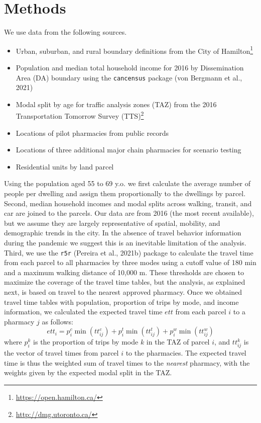 \documentclass[]{elsarticle} %
\providecommand{\tightlist}{%
  \setlength{\itemsep}{0pt}\setlength{\parskip}{0pt}}
\begin{document}
\hypertarget{methods}{%
\section{Methods}\label{methods}}

We use data from the following sources.

\begin{itemize}
\tightlist
\item
  Urban, suburban, and rural boundary definitions from the City of
  Hamilton\footnote{\url{https://open.hamilton.ca/}}
\item
  Population and median total household income for 2016 by Dissemination
  Area (DA) boundary using the \texttt{cancensus} package (von Bergmann
  et al., 2021)
\item
  Modal split by age for traffic analysis zones (TAZ) from the 2016
  Transportation Tomorrow Survey
  (TTS)\footnote{\url{http://dmg.utoronto.ca/}}
\item
  Locations of pilot pharmacies from public records
\item
  Locations of three additional major chain pharmacies for scenario
  testing
\item
  Residential units by land parcel
\end{itemize}

Using the population aged 55 to 69 y.o. we first calculate the average
number of people per dwelling and assign them proportionally to the
dwellings by parcel. Second, median household incomes and modal splits
across walking, transit, and car are joined to the parcels. Our data are
from 2016 (the most recent available), but we assume they are largely
representative of spatial, mobility, and demographic trends in the city.
In the absence of travel behavior information during the pandemic we
suggest this is an inevitable limitation of the analysis. Third, we use
the \texttt{r5r} (Pereira et al., 2021b) package to calculate the travel
time from each parcel to all pharmacies by three modes using a cutoff
value of 180 min and a maximum walking distance of 10,000 m. These
thresholds are chosen to maximize the coverage of the travel time
tables, but the analysis, as explained next, is based on travel to the
nearest approved pharmacy. Once we obtained travel time tables with
population, proportion of trips by mode, and income information, we
calculated the expected travel time \(ett\) from each parcel \(i\) to a
pharmacy \(j\) as follows: \[
ett_i = p^c_i \min(tt^c_{ij}) + p^t_i \min(tt^t_{ij}) + p^w_i \min(tt^w_{ij})
\] \noindent where \(p^k_i\) is the proportion of trips by mode \(k\) in
the TAZ of parcel \(i\), and \(tt^k_{ij}\) is the vector of travel times
from parcel \(i\) to the pharmacies. The expected travel time is thus
the weighted sum of travel times to the \emph{nearest} pharmacy, with
the weights given by the expected modal split in the TAZ.
\end{document}

